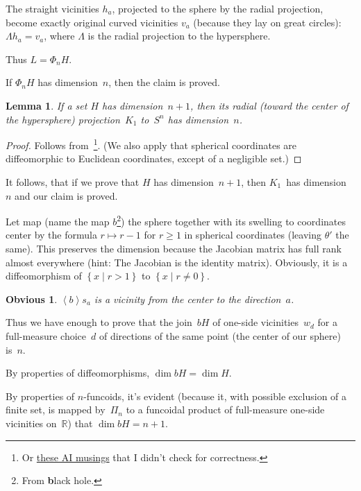 \documentclass[oneside,draft]{amsart}
\newcommand{\setcond}[2]{\left\{#1\mid#2\right\}}
\newcommand{\supfun}[1]{\left\langle#1\right\rangle}
\newtheorem{lem}{Lemma}
\newtheorem{obvious}{Obvious}
\begin{document}
The straight vicinities $h_a$, projected to the sphere by the radial projection, become exactly original curved vicinities $v_a$ (because they lay on great circles): $\Lambda h_a=v_a$, where $\Lambda$ is the radial projection to the hypersphere.

Thus $L = \Phi_n H$.

If $\Phi_n H$ has dimension~$n$, then the claim is proved.

\begin{lem}
If a set $H$ has dimension~$n+1$, then its radial (toward the center of the hypersphere) projection~$K_1$ to~$S^n$ has dimension~$n$.
\end{lem}

\begin{proof}
Follows from~\cite{189275}\footnote{Or \href{https://grok.com/share/bGVnYWN5_2e0aef8b-4309-420f-815c-a09d76ae97c1}{these AI musings}
that I didn't check for correctness.}.
(We also apply that spherical coordinates are diffeomorphic to Euclidean coordinates, except of a negligible set.)
\end{proof}

It follows, that if we prove that $H$ has dimension~$n+1$, then $K_1$~has dimension~$n$ and our claim is proved.

Let map (name the map $b$\footnote{From \textbf{b}lack hole.}) the sphere together with its swelling to coordinates center by the formula $r\mapsto r-1$ for $r\geq 1$ in spherical coordinates (leaving $\theta'$ the same).
This preserves the dimension because the Jacobian matrix has full rank almost everywhere (hint: The Jacobian is the identity matrix).
Obviously, it is a diffeomorphism of $\setcond{x}{r>1}$ to $\setcond{x}{r\ne 0}$.

\begin{obvious}
$\supfun{b}s_a$ is a vicinity from the center to the direction~$a$.
\end{obvious}

Thus we have enough to prove that the join~$bH$ of one-si\-de vicinities~$w_d$ for a full-me\-a\-su\-re choice~$d$ of directions of the same point (the center of our sphere) is~$n$.

By properties of diffeomorphisms, $\dim bH = \dim H$.

By properties of $n$-fun\-co\-ids, it's evident (because it, with possible exclusion of a finite set, is mapped by~$\Pi_n$ to a funcoidal product of full-measure one-si\-de vicinities on~$\mathbb{R}$) that $\dim bH=n+1$. 
\end{document}
